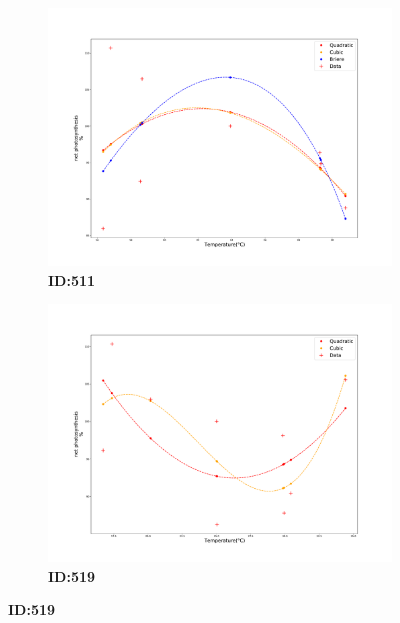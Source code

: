 \documentclass[11pt]{article}
\begin{document}
\begin{figure}
    \begin{subfigure}[t]{.5\textwidth}
      \center
      \includegraphics[width=\linewidth]{../Results/Results_backup/images/TPC_fitting511.pdf}
      \caption{\textbf{ID:511}}
    \end{subfigure}
    \hfill
    \begin{subfigure}[t]{.5\textwidth}
      \center
      \includegraphics[width=\linewidth]{../Results/Results_backup/images/TPC_fitting519.pdf}
      \caption{\textbf{ID:519}}
    \end{subfigure}
  
    \medskip


\end{figure}
\end{document}
